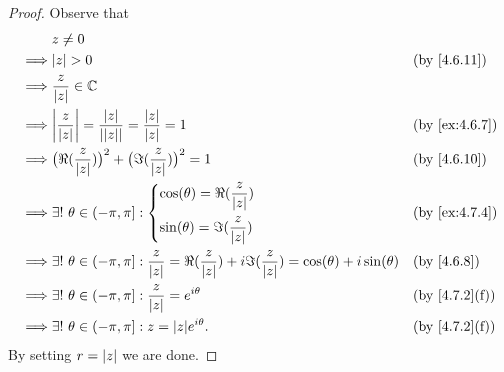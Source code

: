\begin{proof}
  Observe that
  \begin{align*}
             & z \neq 0                                                                                                                                                                     \\
    \implies & \abs{z} > 0                                                                                                                                 &  & \text{(by \cref{4.6.11})}   \\
    \implies & \dfrac{z}{\abs{z}} \in \C                                                                                                                                                    \\
    \implies & \abs{\dfrac{z}{\abs{z}}} = \dfrac{\abs{z}}{\abs{\abs{z}}} = \dfrac{\abs{z}}{\abs{z}} = 1                                                    &  & \text{(by \cref{ex:4.6.7})} \\
    \implies & \big(\Re(\dfrac{z}{\abs{z}})\big)^2 + \big(\Im(\dfrac{z}{\abs{z}})\big)^2 = 1                                                               &  & \text{(by \cref{4.6.10})}   \\
    \implies & \exists!\ \theta \in (-\pi, \pi] : \begin{dcases}
                                                    \cos(\theta) = \Re(\dfrac{z}{\abs{z}}) \\
                                                    \sin(\theta) = \Im(\dfrac{z}{\abs{z}})
                                                  \end{dcases}                                                                    &  & \text{(by \cref{ex:4.7.4})}                          \\
    \implies & \exists!\ \theta \in (-\pi, \pi] : \dfrac{z}{\abs{z}} = \Re(\dfrac{z}{\abs{z}}) + i \Im(\dfrac{z}{\abs{z}}) = \cos(\theta) + i \sin(\theta) &  & \text{(by \cref{4.6.8})}    \\
    \implies & \exists!\ \theta \in (-\pi, \pi] : \dfrac{z}{\abs{z}} = e^{i \theta}                                                                        &  & \text{(by \cref{4.7.2}(f))} \\
    \implies & \exists!\ \theta \in (-\pi, \pi] : z = \abs{z} e^{i \theta}.                                                                                &  & \text{(by \cref{4.7.2}(f))}
  \end{align*}
  By setting \(r = \left\lvert z\right\rvert\) we are done.
\end{proof}

